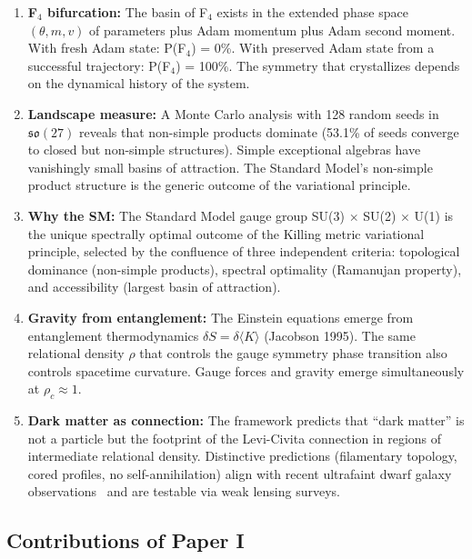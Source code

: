 \begin{enumerate}
\item \textbf{F$_4$ bifurcation:} The basin of F$_4$ exists in the extended phase space $(\theta, m, v)$ of parameters plus Adam momentum plus Adam second moment. With fresh Adam state: P(F$_4$) = 0\%. With preserved Adam state from a successful trajectory: P(F$_4$) = 100\%. The symmetry that crystallizes depends on the dynamical history of the system.

\item \textbf{Landscape measure:} A Monte Carlo analysis with 128 random seeds in $\mathfrak{so}(27)$ reveals that non-simple products dominate (53.1\% of seeds converge to closed but non-simple structures). Simple exceptional algebras have vanishingly small basins of attraction. The Standard Model's non-simple product structure is the generic outcome of the variational principle.

\item \textbf{Why the SM:} The Standard Model gauge group SU(3) $\times$ SU(2) $\times$ U(1) is the unique spectrally optimal outcome of the Killing metric variational principle, selected by the confluence of three independent criteria: topological dominance (non-simple products), spectral optimality (Ramanujan property), and accessibility (largest basin of attraction).

\item \textbf{Gravity from entanglement:} The Einstein equations emerge from entanglement thermodynamics $\delta S = \delta\langle K \rangle$ (Jacobson 1995). The same relational density $\rho$ that controls the gauge symmetry phase transition also controls spacetime curvature. Gauge forces and gravity emerge simultaneously at $\rho_c \approx 1$.

\item \textbf{Dark matter as connection:} The framework predicts that ``dark matter'' is not a particle but the footprint of the Levi-Civita connection in regions of intermediate relational density. Distinctive predictions (filamentary topology, cored profiles, no self-annihilation) align with recent ultrafaint dwarf galaxy observations~\cite{SanchezAlmeitaTrujilloPlastino2024} and are testable via weak lensing surveys.
\end{enumerate}

\subsection{Contributions of Paper I}\label{sec:contributions}

